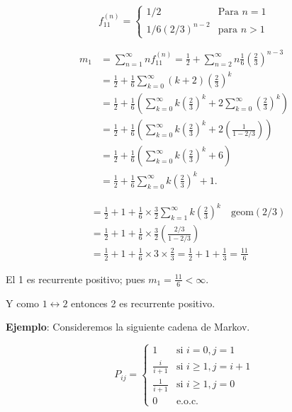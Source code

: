 \documentclass[12pt,a4paper]{article}
\begin{document}
\begin{equation*}
f_{11}^{(n)} = \begin{cases}
1/2 & \text{Para } n=1 \\
1/6 (2/3)^{n-2} & \text{para } n>1
\end{cases}
\end{equation*}

\begin{align*}
m_1 &= \sum_{n=1}^{\infty} n f_{11}^{(n)} = \frac{1}{2} + \sum_{n=2}^{\infty} n \frac{1}{6} \left(\frac{2}{3}\right)^{n-3} \\
&= \frac{1}{2} + \frac{1}{6} \sum_{k=0}^{\infty} (k+2) \left(\frac{2}{3}\right)^k \\
&= \frac{1}{2} + \frac{1}{6} \left(\sum_{k=0}^{\infty} k \left(\frac{2}{3}\right)^k + 2 \sum_{k=0}^{\infty} \left(\frac{2}{3}\right)^k\right) \\
&= \frac{1}{2} + \frac{1}{6} \left(\sum_{k=0}^{\infty} k \left(\frac{2}{3}\right)^k + 2 \left(\frac{1}{1 - 2/3}\right)\right) \\
&= \frac{1}{2} + \frac{1}{6} \left(\sum_{k=0}^{\infty} k \left(\frac{2}{3}\right)^k + 6\right) \\
&= \frac{1}{2} + \frac{1}{6} \sum_{k=0}^{\infty} k \left(\frac{2}{3}\right)^k + 1.
\end{align*}

\begin{align*}
&= \frac{1}{2} + 1 + \frac{1}{6} \times \frac{3}{2} \sum_{k=1}^{\infty} k \left(\frac{2}{3}\right)^k \quad \text{geom}(2/3) \\
&= \frac{1}{2} + 1 + \frac{1}{6} \times \frac{3}{2} \left(\frac{2/3}{1 - 2/3}\right) \\
&= \frac{1}{2} + 1 + \frac{1}{6} \times 3 \times \frac{2}{3} = \frac{1}{2} + 1 + \frac{1}{3} = \frac{11}{6}
\end{align*}

El 1 es recurrente positivo; pues $m_1 = \frac{11}{6} < \infty$.

Y como $1 \leftrightarrow 2$ entonces 2 es recurrente positivo.

\textbf{Ejemplo}: Consideremos la siguiente cadena de Markov.

\begin{equation*}
P_{ij} = \begin{cases}
1 & \text{si } i = 0, j = 1 \\
\frac{i}{i+1} & \text{si } i \geq 1, j = i+1 \\
\frac{1}{i+1} & \text{si } i \geq 1, j = 0 \\
0 & \text{e.o.c.}
\end{cases}
\end{equation*}
\end{document}
